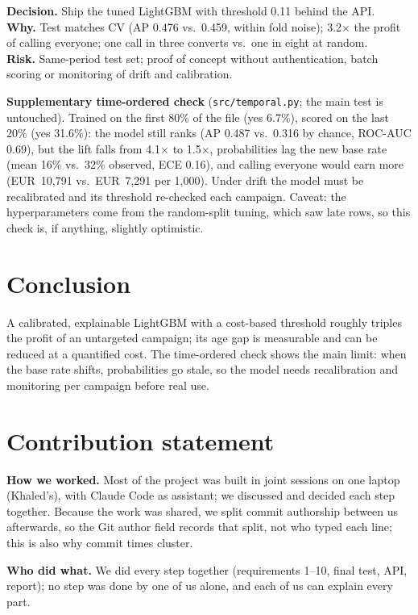 \documentclass[11pt,a4paper]{article}
\newcommand{\eur}[1]{EUR~#1}
\newcommand{\dwr}[3]{\par\smallskip\noindent\colorbox{gray!10}{\parbox{\dimexpr\linewidth-2\fboxsep}{\small
\textbf{Decision.} #1\\ \textbf{Why.} #2\\ \textbf{Risk.} #3}}\par\smallskip}
\begin{document}
\dwr{Ship the tuned LightGBM with threshold 0.11 behind the API.}
{Test matches CV (AP 0.476 vs.\ 0.459, within fold noise); 3.2$\times$ the profit of calling everyone;
one call in three converts vs.\ one in eight at random.}
{Same-period test set; proof of concept without authentication, batch scoring or monitoring of
drift and calibration.}

\textbf{Supplementary time-ordered check} (\texttt{src/temporal.py}; the main test is untouched).
Trained on the first 80\% of the file (yes 6.7\%), scored on the last 20\% (yes 31.6\%): the model
still ranks (AP 0.487 vs.\ 0.316 by chance, ROC-AUC 0.69), but the lift falls from 4.1$\times$ to
1.5$\times$, probabilities lag the new base rate (mean 16\% vs.\ 32\% observed, ECE 0.16), and calling
everyone would earn more (\eur{10,791} vs.\ \eur{7,291} per 1,000). Under drift the model must be
recalibrated and its threshold re-checked each campaign. Caveat: the hyperparameters come from the
random-split tuning, which saw late rows, so this check is, if anything, slightly optimistic.

\section{Conclusion}

A calibrated, explainable LightGBM with a cost-based threshold roughly triples the profit of an
untargeted campaign; its age gap is measurable and can be reduced at a quantified cost. The
time-ordered check shows the main limit: when the base rate shifts, probabilities go stale, so the
model needs recalibration and monitoring per campaign before real use.

\section*{Contribution statement}
\textbf{How we worked.} Most of the project was built in joint sessions on one laptop (Khaled's),
with Claude Code as assistant; we discussed and decided each step together. Because the work was
shared, we split commit authorship between us afterwards, so the Git author field records that
split, not who typed each line; this is also why commit times cluster.

\textbf{Who did what.} We did every step together (requirements 1--10, final test, API, report);
no step was done by one of us alone, and each of us can explain every part.
\end{document}
